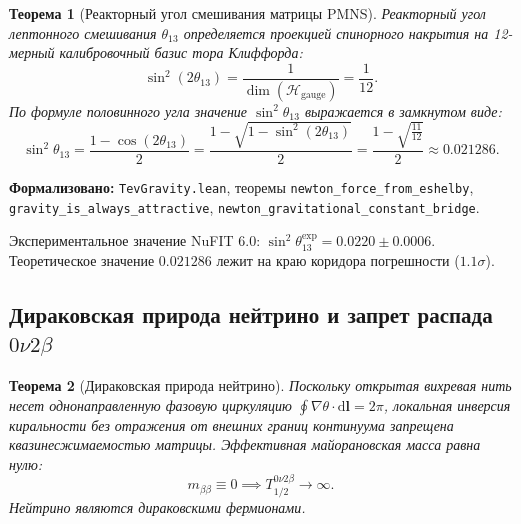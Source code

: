 \documentclass[11pt,a4paper]{article}
\newtheorem{theorem}{Теорема}
\theoremstyle{definition}
\theoremstyle{remark}
\begin{document}
\begin{theorem}[Реакторный угол смешивания матрицы PMNS]
\label{thm:reactor_angle_exact}
Реакторный угол лептонного смешивания $\theta_{13}$ определяется проекцией спинорного накрытия на 12-мерный калибровочный базис тора Клиффорда:
\begin{equation}
\sin^2(2\theta_{13}) = \frac{1}{\dim(\mathcal{H}_{\mathrm{gauge}})} = \frac{1}{12}.
\label{eq:double_angle_12}
\end{equation}
По формуле половинного угла значение $\sin^2\theta_{13}$ выражается в замкнутом виде:
\begin{equation}
\sin^2\theta_{13} = \frac{1 - \cos(2\theta_{13})}{2} = \frac{1 - \sqrt{1 - \sin^2(2\theta_{13})}}{2} = \frac{1 - \sqrt{\frac{11}{12}}}{2} \approx 0.021286.
\label{eq:sin2_theta13_analytical}
\end{equation}
\end{theorem}

\noindent\small\textbf{Формализовано:} \texttt{TevGravity.lean}, теоремы \texttt{newton_force_from_eshelby}, \texttt{gravity_is_always_attractive}, \texttt{newton_gravitational_constant_bridge}.

Экспериментальное значение NuFIT 6.0: $\sin^2\theta_{13}^{\mathrm{exp}} = 0.0220 \pm 0.0006$. Теоретическое значение $0.021286$ лежит на краю коридора погрешности ($1.1\sigma$).
	
\subsection{Дираковская природа нейтрино и запрет распада $0\nu 2\beta$}
	
\begin{theorem}[Дираковская природа нейтрино]
\label{thm:dirac_neutrino_proof}
Поскольку открытая вихревая нить несет однонаправленную фазовую циркуляцию $\oint \nabla\theta \cdot \mathrm{d}\mathbf{l} = 2\pi$, локальная инверсия киральности без отражения от внешних границ континуума запрещена квазинесжимаемостью матрицы. Эффективная майорановская масса равна нулю:
\begin{equation}
m_{\beta\beta} \equiv 0 \implies T_{1/2}^{0\nu 2\beta} \to \infty.
\label{eq:majorana_mass_zero}
\end{equation}
Нейтрино являются дираковскими фермионами.
\end{theorem}
	
\end{document}
